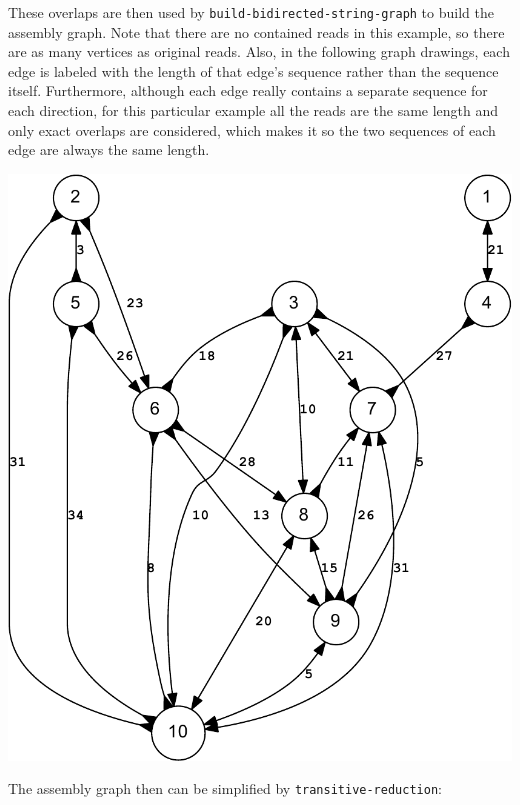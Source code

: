 \documentclass[12pt]{article}
\newcommand{\ProgramName}[1]{{\tt #1}}
\begin{document}
These overlaps are then used by \ProgramName{build-bidirected-string-graph} to
build the assembly graph.  Note that there are no contained reads in this
example, so there are as many vertices as original reads.  Also, in the
following graph drawings, each edge is labeled with the length of that edge's
sequence rather than the sequence itself.  Furthermore, although each edge
really contains a separate sequence for each direction, for this particular
example all the reads are the same length and only exact overlaps are
considered, which makes it so the two sequences of each edge are always the same
length.

\begin{center}
	\includegraphics[scale=0.7]{example_200bp.bidigraph-crop.pdf}	
\end{center}

The assembly graph then can be simplified by \ProgramName{transitive-reduction}:
\end{document}
